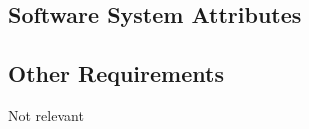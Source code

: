 \documentclass{article}
\begin{document}
	\subsection{Software System Attributes}
	\subsection{Other Requirements}
	Not relevant
\end{document}
